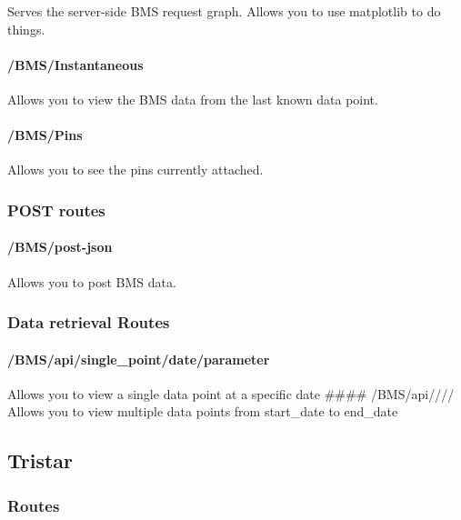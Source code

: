 Serves the server-side BMS request graph. Allows you to use matplotlib
to do things.

\paragraph{/BMS/Instantaneous}\label{bmsinstantaneous}

Allows you to view the BMS data from the last known data point.

\paragraph{/BMS/Pins}\label{bmspins}

Allows you to see the pins currently attached.

\subsubsection{POST routes}\label{post-routes}

\paragraph{/BMS/post-json}\label{bmspost-json}

Allows you to post BMS data.

\subsubsection{Data retrieval Routes}\label{data-retrieval-routes-1}

\paragraph{/BMS/api/single\_point/date/parameter}\label{bmsapisingleux5fpointdateparameter}

Allows you to view a single data point at a specific date \#\#\#\#
/BMS/api//// Allows you to view multiple data points from start\_date to
end\_date

\subsection{Tristar}\label{tristar}

\subsubsection{Routes}\label{routes-2}

